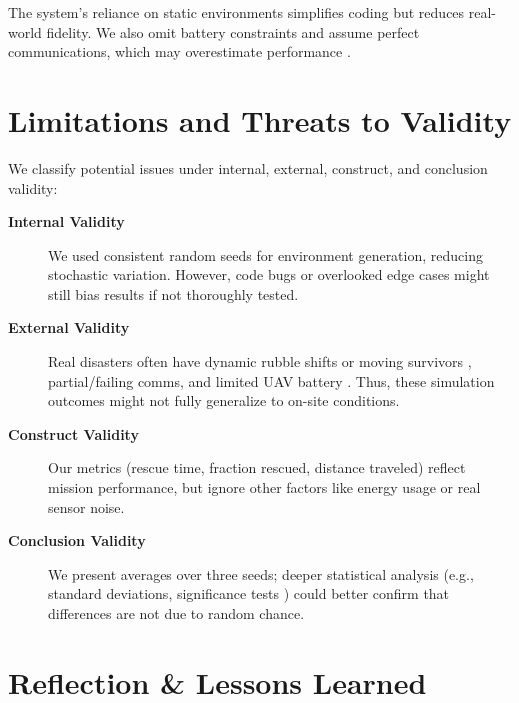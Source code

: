 \documentclass[12pt,a4paper]{report}
\begin{document}
The system’s reliance on static environments simplifies coding but reduces real-world
fidelity. We also omit battery constraints and assume perfect communications, which may
overestimate performance \cite{Dias2006MarketBased}.

\section{Limitations and Threats to Validity}
We classify potential issues under internal, external, construct, and conclusion validity:

\begin{description}
  \item[\textbf{Internal Validity}] We used consistent random seeds for environment generation,
  reducing stochastic variation. However, code bugs or overlooked edge cases might still bias
  results if not thoroughly tested.

  \item[\textbf{External Validity}] Real disasters often have dynamic rubble shifts or moving
  survivors \cite{Auclair2021CollapseRisk,Oleynikova2018ReplanDynamic}, partial/failing comms, and limited UAV battery \cite{Murphy2014DisasterRobotics}. 
  Thus, these simulation outcomes might not fully generalize to on-site conditions.

  \item[\textbf{Construct Validity}] Our metrics (rescue time, fraction rescued, distance traveled)
  reflect mission performance, but ignore other factors like energy usage or real sensor noise.

  \item[\textbf{Conclusion Validity}] We present averages over three seeds; deeper statistical
  analysis (e.g., standard deviations, significance tests \cite{Montgomery2017DOE}) could better confirm
  that differences are not due to random chance.
\end{description}

\section{Reflection \& Lessons Learned}
\end{document}
